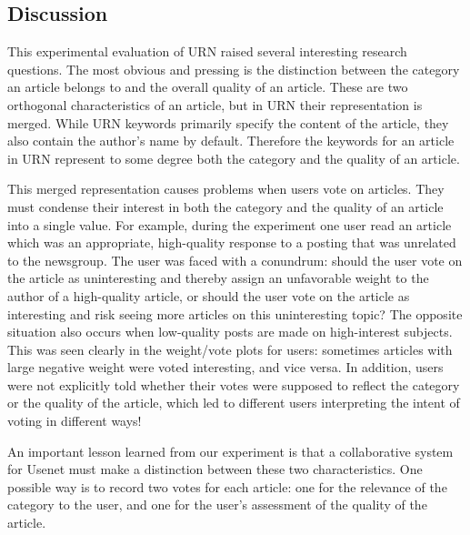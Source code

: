 
\subsection{Discussion}

This experimental evaluation of URN raised several interesting research
questions.  The most obvious and pressing is the distinction between the
category an article belongs to and the overall quality of an article. These
are two orthogonal characteristics of an article, but in URN their
representation is merged. While URN keywords primarily specify the content
of the article, they also contain the author's name by default.  Therefore
the keywords for an article in URN represent to some degree both the
category and the quality of an article.

This merged representation causes problems when users vote on articles.
They must condense their interest in both the category and the quality of
an article into a single value. For example, during the experiment one user
read an article which was an appropriate, high-quality response to a
posting that was unrelated to the newsgroup. The user was faced with a
conundrum: should the user vote on the article as uninteresting and thereby
assign an unfavorable weight to the author of a high-quality article, or
should the user vote on the article as interesting and risk seeing more
articles on this uninteresting topic? The opposite situation also occurs
when low-quality posts are made on high-interest subjects. This was seen
clearly in the weight/vote plots for users: sometimes articles with large
negative weight were voted interesting, and vice versa. In addition, users
were not explicitly told whether their votes were supposed to reflect the
category or the quality of the article, which led to different users
interpreting the intent of voting in different ways!  

An important lesson learned from our experiment is that a collaborative
system for Usenet must make a distinction between these two
characteristics. One possible way is to record two votes for each article:
one for the relevance of the category to the user, and one for the user's
assessment of the quality of the article.

